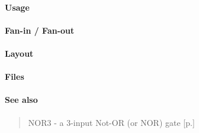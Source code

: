 \paragraph{Usage}

\paragraph{Fan-in / Fan-out}

\paragraph{Layout}

\paragraph{Files}

\paragraph{See also}
\begin{quote}
    NOR3 - a 3-input Not-OR (or NOR) gate [p.\pageref{NOR3}]
\end{quote}
